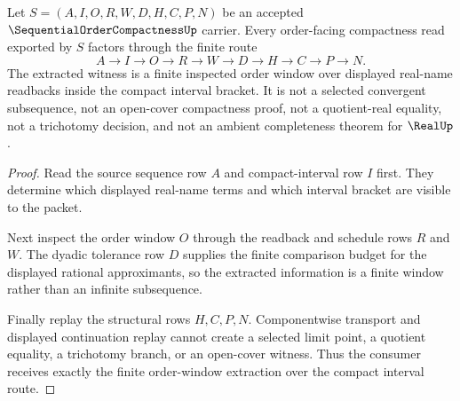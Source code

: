 \begin{theorem}
\label{thm:sequential-order-compactness-finite-window-extraction}
Let $S=(A,I,O,R,W,D,H,C,P,N)$ be an accepted $\SequentialOrderCompactnessUp$ carrier. Every order-facing compactness read exported by $S$ factors through the finite route
$$
A \to I \to O \to R \to W \to D \to H \to C \to P \to N.
$$
The extracted witness is a finite inspected order window over displayed real-name readbacks inside the compact interval bracket. It is not a selected convergent subsequence, not an open-cover compactness proof, not a quotient-real equality, not a trichotomy decision, and not an ambient completeness theorem for $\RealUp$.
\end{theorem}
\begin{proof}
Read the source sequence row $A$ and compact-interval row $I$ first. They determine which displayed real-name terms and which interval bracket are visible to the packet.

Next inspect the order window $O$ through the readback and schedule rows $R$ and $W$. The dyadic tolerance row $D$ supplies the finite comparison budget for the displayed rational approximants, so the extracted information is a finite window rather than an infinite subsequence.

Finally replay the structural rows $H,C,P,N$. Componentwise transport and displayed continuation replay cannot create a selected limit point, a quotient equality, a trichotomy branch, or an open-cover witness. Thus the consumer receives exactly the finite order-window extraction over the compact interval route.
\end{proof}


\begin{closurestatus}{\SequentialOrderCompactnessUp}
  \theoryclosure{\seedClosure}
  \formalstatus{\unformalizedV}
\end{closurestatus}
